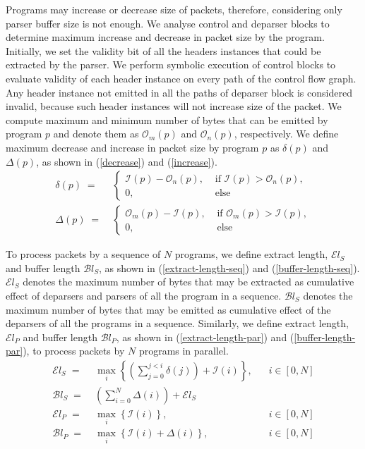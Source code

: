 Programs may increase or decrease size of packets, therefore, considering only parser buffer size is not enough.
We analyse control and deparser blocks to determine maximum increase and decrease in packet size by the program.
Initially, we set the validity bit of all the headers instances that could be extracted by the parser. 
We perform symbolic execution of control blocks to evaluate validity of each header instance on every path of the control flow graph.
Any header instance not emitted in all the paths of deparser block is considered invalid, because such header instances will not increase size of the packet.
We compute maximum and minimum number of bytes that can be emitted by program $p$ and denote them as $\mathcal{O}_{m}(p)$ and $\mathcal{O}_{n}(p)$, respectively.
We define maximum decrease and increase in packet size by program $p$ as $\delta(p)$ and $\Delta(p)$, as shown in (\ref{decrease}) and (\ref{increase}).
\begin{align}
\delta(p)\; =& \; \begin{cases}
\mathcal{I}(p) - \mathcal{O}_{n}(p), & \text{ if } \mathcal{I}(p) > \mathcal{O}_{n}(p), \\
0, & \text{ else }
\end{cases} \label{decrease} \\
\Delta(p) \; =& \; \begin{cases}
\mathcal{O}_{m}(p) - \mathcal{I}(p), & \text{ if } \mathcal{O}_{m}(p) > \mathcal{I}(p), \\
0, & \text{ else } \label{increase}
\end{cases}
\end{align}

To process packets by a sequence of $N$ programs, we define extract length, $\mathcal{E}l_{S}$ and buffer length $\mathcal{B}l_{S}$, as shown in (\ref{extract-length-seq}) and (\ref{buffer-length-seq}).
$\mathcal{E}l_{S}$ denotes the maximum number of bytes that may be extracted as cumulative effect of deparsers and parsers of all the program in a sequence.
$\mathcal{B}l_{S}$ denotes the maximum number of bytes that may be emitted as cumulative effect of the deparsers of all the programs in a sequence.
Similarly, we define extract length, $\mathcal{E}l_{P}$ and buffer length $\mathcal{B}l_{P}$, as shown in (\ref{extract-length-par}) and (\ref{buffer-length-par}), to process packets by $N$ programs in parallel.
\begin{align}
\mathcal{E}l_{S} \; =& \; \max_{i} \left\{ \left( \sum_{j=0}^{j<i} \delta(j) \right)+ \mathcal{I}(i) \right\},&\;\;\;i  \in [0,N] \label{extract-length-seq} \\
\mathcal{B}l_{S} \; =& \; \left( \sum_{i=0}^{N} \Delta(i) \right)+ \mathcal{E}l_{S} & \label{buffer-length-seq} \\
\mathcal{E}l_{P} \; =& \; \max_{i} \left\{ \mathcal{I}(i) \right\},&\;\;\;i  \in [0,N] \label{extract-length-par} \\
\mathcal{B}l_{P} \; =& \; \max_{i} \left\{ \mathcal{I}(i) + \Delta(i) \right\},&\;\;\;i  \in [0,N]  \label{buffer-length-par}
\end{align}


